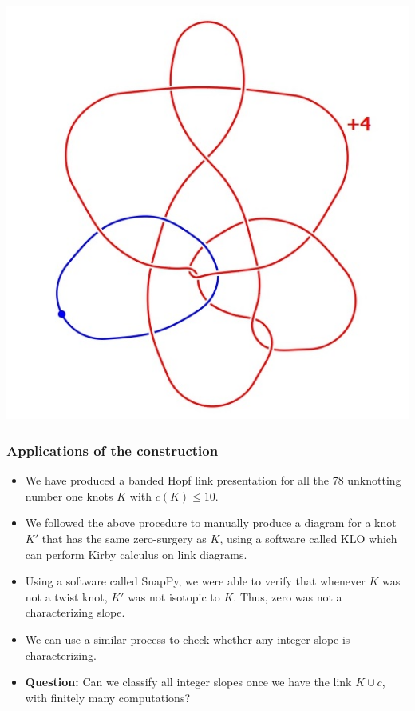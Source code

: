 \documentclass{beamer}
\theoremstyle{ex}
\theoremstyle{rem}
\begin{document}
\begin{frame}
\begin{itemize}
\begin{center}
				\includegraphics[scale=0.25]{10_125_3}
			\end{center}
		\end{itemize}
	\end{frame}

\begin{frame}
	\frametitle{Applications of the construction}
	\begin{itemize}
		\item We have produced a banded Hopf link presentation for all the 78 unknotting number one knots $K$ with $c(K)\leq 10$.
		\item We followed the above procedure to manually produce a diagram for a knot $K'$ that has the same zero-surgery as $K$, using a software called KLO which can perform Kirby calculus on link diagrams.
		\item Using a software called SnapPy, we were able to verify that whenever $K$ was not a twist knot, $K'$ was not isotopic to $K$. Thus, zero was not a characterizing slope.
		\item We can use a similar process to check whether any integer slope is characterizing.
	\end{itemize}
	\medskip
	\begin{itemize}
		\item \textbf{Question:} Can we classify all integer slopes once we have the link $K\cup c$, with finitely many computations?
	\end{itemize}
\end{frame}
\end{document}
